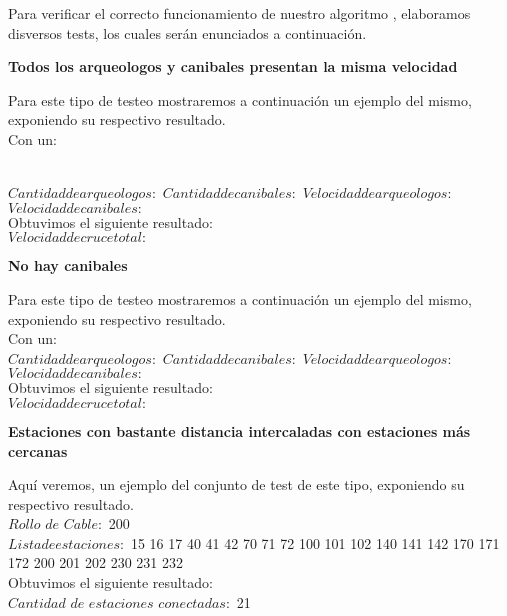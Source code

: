 \indent Para verificar el correcto funcionamiento de nuestro algoritmo , elaboramos disversos tests,
los cuales ser\'an enunciados a continuaci\'on.\\

\begin{center}
 \textbf{Todos los arqueologos y canibales presentan la misma velocidad}
\end{center}
 Para este tipo de testeo mostraremos a continuaci\'on un ejemplo del mismo, exponiendo su respectivo resultado.\\

 Con un:\\\\
  \indent  
	
	$Cantidad de arqueologos: $  
	$Cantidad de canibales: $  
	$Velocidad de arqueologos: $  
	$Velocidad de canibales: $  \\
  
  Obtuvimos el siguiente resultado:\\
  
  $Velocidad de cruce total: $

 \begin{center}
 \textbf{No hay canibales}
\end{center}

Para este tipo de testeo mostraremos a continuaci\'on un ejemplo del mismo, exponiendo su respectivo resultado.\\

 Con un:\\
  \indent 	
  	$Cantidad de arqueologos: $  
	$Cantidad de canibales: $  
	$Velocidad de arqueologos: $  
	$Velocidad de canibales: $  \\
  
  Obtuvimos el siguiente resultado:\\
  
  $Velocidad de cruce total: $\\

\begin{center}
 \textbf{Estaciones con bastante distancia intercaladas con estaciones m\'as cercanas}
\end{center}

Aqu\'i veremos, un ejemplo del conjunto de test de este tipo, exponiendo su respectivo resultado.\\

\indent $Rollo$ $de$ $Cable:$ 200\\
$Lista de estaciones:$ 15 16 17  40 41 42 70 71 72 100 101 102 140 141 142 170 171 172 200 201 202 230 231 232\\

Obtuvimos el siguiente resultado:\\ 
  
  $Cantidad$ $de$ $estaciones$ $conectadas:$ 21
